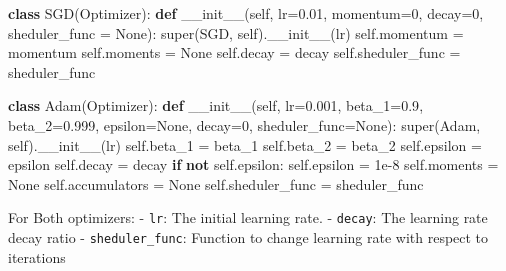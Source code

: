 \documentclass[11pt]{article}
\newenvironment{Shaded}{}{}
\newcommand{\KeywordTok}[1]{\textcolor[rgb]{0.00,0.44,0.13}{\textbf{{#1}}}}
\newcommand{\DecValTok}[1]{\textcolor[rgb]{0.25,0.63,0.44}{{#1}}}
\newcommand{\FloatTok}[1]{\textcolor[rgb]{0.25,0.63,0.44}{{#1}}}
\newcommand{\FunctionTok}[1]{\textcolor[rgb]{0.02,0.16,0.49}{{#1}}}
\newcommand{\NormalTok}[1]{{#1}}
\newcommand{\VariableTok}[1]{\textcolor[rgb]{0.10,0.09,0.49}{{#1}}}
\newcommand{\ControlFlowTok}[1]{\textcolor[rgb]{0.00,0.44,0.13}{\textbf{{#1}}}}
\newcommand{\OperatorTok}[1]{\textcolor[rgb]{0.40,0.40,0.40}{{#1}}}
\newcommand{\BuiltInTok}[1]{{#1}}
\begin{document}
\begin{Shaded}
\begin{Highlighting}[]
\KeywordTok{class}\NormalTok{ SGD(Optimizer):}
    \KeywordTok{def} \FunctionTok{__init__}\NormalTok{(}\VariableTok{self}\NormalTok{, lr}\OperatorTok{=}\FloatTok{0.01}\NormalTok{, momentum}\OperatorTok{=}\DecValTok{0}\NormalTok{, decay}\OperatorTok{=}\DecValTok{0}\NormalTok{, sheduler_func }\OperatorTok{=} \VariableTok{None}\NormalTok{):}
        \BuiltInTok{super}\NormalTok{(SGD, }\VariableTok{self}\NormalTok{).}\FunctionTok{__init__}\NormalTok{(lr)}
        \VariableTok{self}\NormalTok{.momentum }\OperatorTok{=}\NormalTok{ momentum}
        \VariableTok{self}\NormalTok{.moments }\OperatorTok{=} \VariableTok{None}
        \VariableTok{self}\NormalTok{.decay }\OperatorTok{=}\NormalTok{ decay}
        \VariableTok{self}\NormalTok{.sheduler_func }\OperatorTok{=}\NormalTok{ sheduler_func}
        
\KeywordTok{class}\NormalTok{ Adam(Optimizer):}
    \KeywordTok{def} \FunctionTok{__init__}\NormalTok{(}\VariableTok{self}\NormalTok{, lr}\OperatorTok{=}\FloatTok{0.001}\NormalTok{, beta_1}\OperatorTok{=}\FloatTok{0.9}\NormalTok{, beta_2}\OperatorTok{=}\FloatTok{0.999}\NormalTok{, epsilon}\OperatorTok{=}\VariableTok{None}\NormalTok{, decay}\OperatorTok{=}\DecValTok{0}\NormalTok{, sheduler_func}\OperatorTok{=}\VariableTok{None}\NormalTok{):}
        \BuiltInTok{super}\NormalTok{(Adam, }\VariableTok{self}\NormalTok{).}\FunctionTok{__init__}\NormalTok{(lr)}
        \VariableTok{self}\NormalTok{.beta_1 }\OperatorTok{=}\NormalTok{ beta_1}
        \VariableTok{self}\NormalTok{.beta_2 }\OperatorTok{=}\NormalTok{ beta_2}
        \VariableTok{self}\NormalTok{.epsilon }\OperatorTok{=}\NormalTok{ epsilon}
        \VariableTok{self}\NormalTok{.decay }\OperatorTok{=}\NormalTok{ decay}
        \ControlFlowTok{if} \KeywordTok{not} \VariableTok{self}\NormalTok{.epsilon:}
            \VariableTok{self}\NormalTok{.epsilon }\OperatorTok{=} \FloatTok{1e-8}
        \VariableTok{self}\NormalTok{.moments }\OperatorTok{=} \VariableTok{None}
        \VariableTok{self}\NormalTok{.accumulators }\OperatorTok{=} \VariableTok{None}
        \VariableTok{self}\NormalTok{.sheduler_func }\OperatorTok{=}\NormalTok{ sheduler_func}
\end{Highlighting}
\end{Shaded}

For Both optimizers: - \texttt{lr}: The initial learning rate. -
\texttt{decay}: The learning rate decay ratio - \texttt{sheduler\_func}:
Function to change learning rate with respect to iterations
\end{document}

